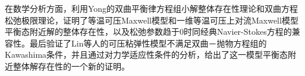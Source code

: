 \begin{cabstract}
在数学分析方面，利用Yong的双曲平衡律方程组小解整体存在性理论和双曲方程松弛极限理论，证明了等温可压Maxwell模型和一维等温可压上对流Maxwell模型平衡态附近解的整体存在性，以及松弛参数趋于$0$时同经典Navier-Stokes方程的兼容性。最后验证了Lin等人的可压粘弹性模型不满足双曲－抛物方程组的Kawashima条件，并且通过对力学适应性条件的分析，给出了这一模型平衡态附近整体解存在性的一个新的证明。



\end{cabstract}

